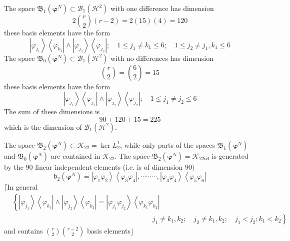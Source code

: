 \documentclass[aps,preprint]{revtex4}%
\begin{document}
The space $\mathfrak{B}_{1}\left(  \mathbf{\varphi}^{N}\right)  \subset
\mathcal{B}_{1}\left(  \mathcal{H}^{2}\right)  $ with one difference has
dimension
\begin{equation}
2\binom{r}{2}\left(  r-2\right)  =2\left(  15\right)  \left(  4\right)  =120
\end{equation}
these basis elements have the form
\begin{equation}
\left\vert \varphi_{j_{1}}\right\rangle \left\langle \varphi_{k_{1}%
}\right\vert \wedge\left\vert \varphi_{j_{2}}\right\rangle \left\langle
\varphi_{j_{2}}\right\vert ;\quad1\leq j_{1}\neq k_{1}\leq6;\quad1\leq
j_{2}\neq j_{1},k_{1}\leq6
\end{equation}
The space $\mathfrak{B}_{0}\left(  \mathbf{\varphi}^{N}\right)  \subset
\mathcal{B}_{1}\left(  \mathcal{H}^{2}\right)  $ with no differences has
dimension%
\begin{equation}
\binom{r}{2}=\binom{6}{2}=15
\end{equation}
these basis elements have the form
\begin{equation}
\left\vert \varphi_{j_{1}}\right\rangle \left\langle \varphi_{j_{1}%
}\right\vert \wedge\left\vert \varphi_{j_{2}}\right\rangle \left\langle
\varphi_{j_{2}}\right\vert ;\quad1\leq j_{1}\neq j_{2}\leq6
\end{equation}
The sum of these dimensions is
\begin{equation}
90+120+15=225
\end{equation}
which is the dimension of $\mathcal{B}_{1}\left(  \mathcal{H}^{2}\right)  .$

The space $\mathfrak{B}_{2}\left(  \mathbf{\varphi}^{N}\right)  \subset
\mathcal{K}_{22}=\ker L_{2}^{1}$, while only parts of the spaces
$\mathfrak{B}_{1}\left(  \mathbf{\varphi}^{N}\right)  $ and $\mathfrak{B}%
_{0}\left(  \mathbf{\varphi}^{N}\right)  $ are contained in $\mathcal{K}_{22}%
$. The space $\mathfrak{B}_{2}\left(  \mathbf{\varphi}^{N}\right)
=\mathcal{K}_{22od}$ is generated by the $90$ linear independent elements
(i.e. is of dimension $90)$
\begin{equation}
\mathfrak{b}_{2}\left(  \mathbf{\varphi}^{N}\right)  =\left\vert \varphi
_{1}\varphi_{2}\right\rangle \left\langle \varphi_{3}\varphi_{4}\right\vert
,\cdots\cdots\cdots,\left\vert \varphi_{3}\varphi_{4}\right\rangle
\left\langle \varphi_{5}\varphi_{6}\right\vert
\end{equation}
$\lceil$In general
\begin{align}
&  \left\{  \left\vert \varphi_{j_{1}}\right\rangle \left\langle
\varphi_{k_{1}}\right\vert \wedge\left\vert \varphi_{j_{2}}\right\rangle
\left\langle \varphi_{k_{2}}\right\vert =\left\vert \varphi_{j_{1}}%
\varphi_{j_{2}}\right\rangle \left\langle \varphi_{k_{1}}\varphi_{k_{2}%
}\right\vert \right. \nonumber\\
&  \qquad\qquad\qquad\qquad\qquad\qquad\qquad\qquad\qquad\qquad\left.
j_{1}\neq k_{1},k_{2};\quad j_{2}\neq k_{1},k_{2};\quad j_{1}<j_{2}%
;k_{1}<k_{2}\right\}
\end{align}
and contains $\binom{r}{2}\binom{r-2}{2}$ basis elements$\rfloor$
\end{document}
